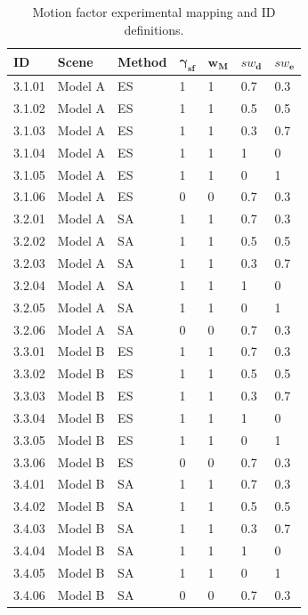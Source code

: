 \begin{table}[!t]
\centering
\footnotesize
\caption{Motion factor experimental mapping and ID definitions.}
\label{tab:motion_params}
\begin{tabular}{@{}lllllll@{}}
\hline
    \textbf{ID} & \textbf{Scene} & \textbf{Method} & $\bm{\gamma_{\text{sf}}}$ & $\bm{w_{\text{M}}}$ & $\bm{\mathit{sw}_{\text{d}}}$ & $\bm{\mathit{sw}_{\text{e}}}$ \\
\hline
    3.1.01 & Model A & ES & 1 & 1 & 0.7 & 0.3 \\
    3.1.02 & Model A & ES & 1 & 1 & 0.5 & 0.5 \\
    3.1.03 & Model A & ES & 1 & 1 & 0.3 & 0.7 \\
    3.1.04 & Model A & ES & 1 & 1 & 1 & 0 \\
    3.1.05 & Model A & ES & 1 & 1 & 0 & 1 \\
    3.1.06 & Model A & ES & 0 & 0 & 0.7 & 0.3 \\
    \noalign{\smallskip}
    3.2.01 & Model A & SA & 1 & 1 & 0.7 & 0.3 \\
    3.2.02 & Model A & SA & 1 & 1 & 0.5 & 0.5 \\
    3.2.03 & Model A & SA & 1 & 1 & 0.3 & 0.7 \\
    3.2.04 & Model A & SA & 1 & 1 & 1 & 0 \\
    3.2.05 & Model A & SA & 1 & 1 & 0 & 1 \\
    3.2.06 & Model A & SA & 0 & 0 & 0.7 & 0.3 \\
    \noalign{\smallskip}
    3.3.01 & Model B & ES & 1 & 1 & 0.7 & 0.3 \\
    3.3.02 & Model B & ES & 1 & 1 & 0.5 & 0.5 \\
    3.3.03 & Model B & ES & 1 & 1 & 0.3 & 0.7 \\
    3.3.04 & Model B & ES & 1 & 1 & 1 & 0 \\
    3.3.05 & Model B & ES & 1 & 1 & 0 & 1 \\
    3.3.06 & Model B & ES & 0 & 0 & 0.7 & 0.3 \\
    \noalign{\smallskip}
    3.4.01 & Model B & SA & 1 & 1 & 0.7 & 0.3 \\
    3.4.02 & Model B & SA & 1 & 1 & 0.5 & 0.5 \\
    3.4.03 & Model B & SA & 1 & 1 & 0.3 & 0.7 \\
    3.4.04 & Model B & SA & 1 & 1 & 1 & 0 \\
    3.4.05 & Model B & SA & 1 & 1 & 0 & 1 \\
    3.4.06 & Model B & SA & 0 & 0 & 0.7 & 0.3 \\
\hline
\end{tabular}
\end{table}